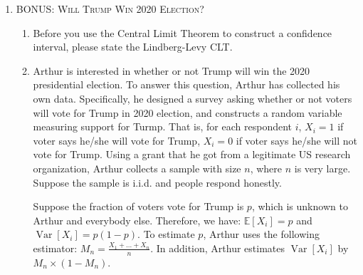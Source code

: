\documentclass[10pt,letterpaper]{article}
\newtheorem{theorem}{Theorem}[section]
\DeclareMathOperator*{\var}{Var}
\theoremstyle{definition}
\numberwithin{equation}{section}
\begin{document}
\begin{enumerate}[I]
\begin{enumerate}[1)]
\begin{enumerate}
\end{enumerate}




\end{enumerate}

\pagebreak

\item \textsc{BONUS: Will Trump Win 2020 Election?} 

\begin{enumerate}
	
\item Before you use the Central Limit Theorem to construct a confidence interval, please state the Lindberg-Levy CLT.
\bigskip
\bigskip
\bigskip
\bigskip
\bigskip
\bigskip

    \item Arthur is interested in whether or not Trump will win the 2020 presidential election. To answer this question, Arthur has collected his own data. Specifically, he designed a survey asking whether or not voters will vote for Trump in 2020 election, and constructs a random variable measuring support for Turmp.  That is, for each respondent $i$, $X_{i} = 1$ if voter says he/she will vote for Trump, $X_{i} = 0$ if voter says he/she will not vote for Trump. Using a grant that he got from a legitimate US research organization, Arthur collects a sample with size $n$, where $n$ is very large. Suppose the sample is i.i.d. and people respond honestly.
    
    Suppose the fraction of voters vote for Trump is $p$, which is unknown to Arthur and everybody else. Therefore, we have: $\mathbb{E}[X_{i}] = p$ and $\var[X_{i}] = p (1 - p)$. To estimate $p$, Arthur uses the following estimator: $M_{n} = \frac{X_{1} + ... + X_{n}}{n}$. In addition, Arthur estimates $\var[X_{i}]$ by $M_{n} \times (1 - M_{n})$.
    

\end{enumerate}
\end{enumerate}
\end{document}
